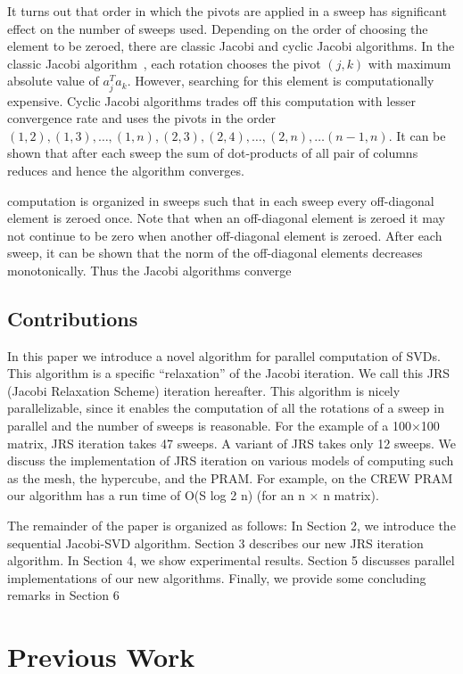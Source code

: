 \documentclass[10pt, conference, compsocconf]{IEEEtran}
\begin{document}
It turns out that order in which the pivots are applied in a sweep has significant effect on the number of sweeps used. Depending on the order of choosing the element to be zeroed, there are classic Jacobi and cyclic Jacobi algorithms. In the classic Jacobi algorithm~\cite{golub2012matrix}, each rotation chooses the pivot $(j,k)$ with maximum absolute value of $a_j^{T}a_k$. However, searching for this element is computationally expensive. Cyclic Jacobi algorithms trades off this computation with lesser convergence rate and uses the pivots in the order $(1,2), (1,3), \ldots, (1,n), (2,3), (2,4), \ldots, (2,n), \ldots (n-1,n)$.  It can be shown that after each sweep the sum of dot-products of all pair of columns reduces and hence the algorithm converges. 

 
computation is organized in sweeps such that in each sweep
every off-diagonal element is zeroed once. Note that when an
off-diagonal element is zeroed it may not continue to be zero
when another off-diagonal element is zeroed. After each sweep,
it can be shown that the norm of the off-diagonal elements
decreases monotonically. Thus the Jacobi algorithms converge
\subsection{Contributions}

In this paper we introduce a novel algorithm for parallel computation of SVDs. This algorithm is a specific “relaxation” of the Jacobi iteration. We call this JRS (Jacobi Relaxation Scheme) iteration hereafter. This algorithm is nicely parallelizable, since it enables the computation of all the rotations of a sweep in parallel and the number of sweeps is reasonable. For the example of a 100×100 matrix, JRS iteration takes 47 sweeps. A variant of JRS takes only 12 sweeps.  We discuss the implementation of JRS iteration on various models of computing such as the mesh, the hypercube, and the PRAM. For example, on the CREW PRAM our algorithm has a run time of O(S log 2 n) (for an n × n matrix).

The remainder of the paper is organized as follows: In
Section 2, we introduce the sequential Jacobi-SVD algorithm.
Section 3 describes our new JRS iteration algorithm. In
Section 4, we show experimental results. Section 5 discusses
parallel implementations of our new algorithms. Finally, we
provide some concluding remarks in Section 6

\section{Previous Work}
\end{document}
